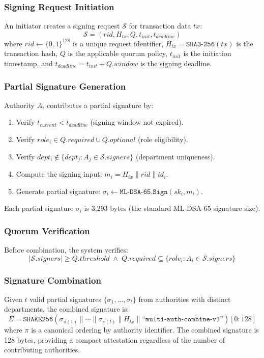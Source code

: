 \documentclass[conference,10pt]{IEEEtran}
\newcommand{\SHAKE}{\texttt{SHAKE256}}
\newcommand{\SHA}{\texttt{SHA3-256}}
\begin{document}
\subsubsection{Signing Request Initiation}
An initiator creates a signing request $\mathcal{S}$ for transaction data $tx$:
\begin{equation}
\mathcal{S} = (rid, H_{tx}, Q, t_{init}, t_{deadline})
\end{equation}
where $rid \leftarrow \{0,1\}^{128}$ is a unique request identifier, $H_{tx} = \SHA(tx)$ is the transaction hash, $Q$ is the applicable quorum policy, $t_{init}$ is the initiation timestamp, and $t_{deadline} = t_{init} + Q.window$ is the signing deadline.

\subsubsection{Partial Signature Generation}
Authority $A_i$ contributes a partial signature by:
\begin{enumerate}
\item Verify $t_{current} < t_{deadline}$ (signing window not expired).
\item Verify $role_i \in Q.required \cup Q.optional$ (role eligibility).
\item Verify $dept_i \notin \{dept_j : A_j \in \mathcal{S}.signers\}$ (department uniqueness).
\item Compute the signing input: $m_i = H_{tx} \| rid \| id_i$.
\item Generate partial signature: $\sigma_i \leftarrow \texttt{ML-DSA-65.Sign}(sk_i, m_i)$.
\end{enumerate}

Each partial signature $\sigma_i$ is 3,293 bytes (the standard ML-DSA-65 signature size).

\subsubsection{Quorum Verification}
Before combination, the system verifies:
\begin{equation}
|\mathcal{S}.signers| \geq Q.threshold \;\wedge\; Q.required \subseteq \{role_i : A_i \in \mathcal{S}.signers\}
\end{equation}

\subsubsection{Signature Combination}
Given $t$ valid partial signatures $\{\sigma_1, \ldots, \sigma_t\}$ from authorities with distinct departments, the combined signature is:
\begin{equation}
\Sigma = \SHAKE\!\left(\sigma_{\pi(1)} \| \cdots \| \sigma_{\pi(t)} \| H_{tx} \| \texttt{``multi-auth-combine-v1''}\right)[0{:}128]
\end{equation}
where $\pi$ is a canonical ordering by authority identifier. The combined signature is 128 bytes, providing a compact attestation regardless of the number of contributing authorities.
\end{document}
